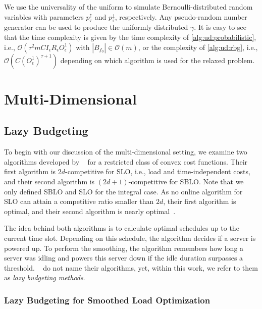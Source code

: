 We use the universality of the uniform to simulate Bernoulli-distributed random variables with parameters $p_{\tau}^{\uparrow}$ and $p_{\tau}^{\downarrow}$, respectively. Any pseudo-random number generator can be used to produce the uniformly distributed $\gamma$. It is easy to see that the time complexity is given by the time complexity of \cref{alg:ud:probabilistic}, i.e., $\mathcal{O}(\tau^2 m C I_{\epsilon} R_{\epsilon} O_{\epsilon}^1)$ with $|B_{f_0}| \in \mathcal{O}(m)$, or the complexity of \cref{alg:ud:rbg}, i.e., $\mathcal{O}(C (O_{\epsilon}^1)^{\tau+1})$ depending on which algorithm is used for the relaxed problem.

\section{Multi-Dimensional}\label{section:online_algorithms:md}

\subsection{Lazy Budgeting}\label{section:online_algorithms:md:lazy_budgeting}

To begin with our discussion of the multi-dimensional setting, we examine two algorithms developed by \citeauthor*{Albers2021}~\cite{Albers2021} for a restricted class of convex cost functions. Their first algorithm is $2d$-competitive for SLO, i.e., load and time-independent costs, and their second algorithm is $(2d+1)$-competitive for SBLO. Note that we only defined SBLO and SLO for the integral case. As no online algorithm for SLO can attain a competitive ratio smaller than $2d$, their first algorithm is optimal, and their second algorithm is nearly optimal~\cite{Albers2021, Albers2021_2}.

The idea behind both algorithms is to calculate optimal schedules up to the current time slot. Depending on this schedule, the algorithm decides if a server is powered up. To perform the smoothing, the algorithm remembers how long a server was idling and powers this server down if the idle duration surpasses a threshold. \citeauthor*{Albers2021}~\cite{Albers2021} do not name their algorithms, yet, within this work, we refer to them as \emph{lazy budgeting methods}.

\subsubsection{Lazy Budgeting for Smoothed Load Optimization}

